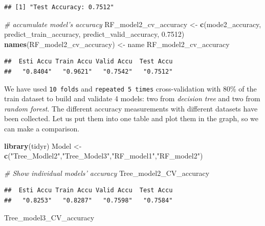 \documentclass[
]{book}
\newenvironment{Shaded}{\begin{snugshade}}{\end{snugshade}}
\newcommand{\CommentTok}[1]{\textcolor[rgb]{0.56,0.35,0.01}{\textit{#1}}}
\newcommand{\FloatTok}[1]{\textcolor[rgb]{0.00,0.00,0.81}{#1}}
\newcommand{\KeywordTok}[1]{\textcolor[rgb]{0.13,0.29,0.53}{\textbf{#1}}}
\newcommand{\NormalTok}[1]{#1}
\newcommand{\StringTok}[1]{\textcolor[rgb]{0.31,0.60,0.02}{#1}}
\begin{document}
\begin{verbatim}
## [1] "Test Accuracy: 0.7512"
\end{verbatim}

\begin{Shaded}
\begin{Highlighting}[]
\CommentTok{# accumulate model's accuracy}
\NormalTok{RF_model2_cv_accuracy <-}\StringTok{ }\KeywordTok{c}\NormalTok{(mode2_accuracy, predict_train_accuracy, predict_valid_accuracy, }\FloatTok{0.7512}\NormalTok{)}
\KeywordTok{names}\NormalTok{(RF_model2_cv_accuracy) <-}\StringTok{ }\NormalTok{name}
\NormalTok{RF_model2_cv_accuracy}
\end{Highlighting}
\end{Shaded}

\begin{verbatim}
##  Esti Accu Train Accu Valid Accu  Test Accu 
##   "0.8404"   "0.9621"   "0.7542"   "0.7512"
\end{verbatim}

We have used \texttt{10\ folds} and \texttt{repeated\ 5\ times} cross-validation with 80\% of the train dataset to build and validate 4 models: two from \emph{decision tree} and two from \emph{random forest}. The different accuracy measurements with different datasets have been collected. Let us put them into one table and plot them in the graph, so we can make a comparison.

\begin{Shaded}
\begin{Highlighting}[]
\KeywordTok{library}\NormalTok{(tidyr)}
\NormalTok{Model <-}\StringTok{ }\KeywordTok{c}\NormalTok{(}\StringTok{"Tree_Modlel2"}\NormalTok{,}\StringTok{"Tree_Model3"}\NormalTok{,}\StringTok{"RF_model1"}\NormalTok{,}\StringTok{"RF_model2"}\NormalTok{)}

\CommentTok{# Show individual models' accuracy}
\NormalTok{Tree_model2_CV_accuracy}
\end{Highlighting}
\end{Shaded}

\begin{verbatim}
##  Esti Accu Train Accu Valid Accu  Test Accu 
##   "0.8253"   "0.8287"   "0.7598"   "0.7584"
\end{verbatim}

\begin{Shaded}
\begin{Highlighting}[]
\NormalTok{Tree_model3_CV_accuracy}
\end{Highlighting}
\end{Shaded}
\end{document}
